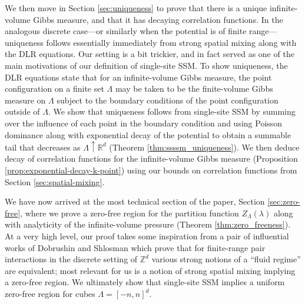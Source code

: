 \documentclass[10pt]{amsart}
\theoremstyle{definition}
\theoremstyle{remark}
\newcommand{\R}{\mathbb{R}}
\begin{document}
	We then move in Section \ref{sec:uniqueness} to prove that there is a unique infinite-volume Gibbs measure, and that it has decaying correlation functions.  
	In the analogous discrete case---or similarly when the potential is of finite range---uniqueness follows essentially immediately from strong spatial mixing along with the DLR equations.  Our setting is a bit trickier, and in fact served as one of the main motivations of our definition of single-site SSM.  To show uniqueness, the DLR equations state that for an infinite-volume Gibbs measure, the point configuration on a finite set $\Lambda$ may be taken to be the finite-volume Gibbs measure on $\Lambda$ subject to the boundary conditions of the point configuration outside of $\Lambda$.  We show that uniqueness follows from single-site SSM by summing over the influence of each point in the boundary condition and using Poisson dominance along with exponential decay of the potential to obtain a summable tail that decreases as $\Lambda \uparrow \R^d$ (Theorem \ref{thm:ssssm_uniqueness}).  We then deduce decay of correlation functions for the infinite-volume Gibbs measure (Proposition \ref{prop:exponential-decay-k-point}) using our bounds on correlation functions from Section \ref{sec:spatial-mixing}.
	
	We have now arrived at the most technical section of the paper, Section \ref{sec:zero-free}, where we prove a zero-free region for the partition function $Z_{\Lambda}(\lambda)$ along with analyticity of the infinite-volume pressure (Theorem \ref{thm:zero_freeness}).  At a very high level, our proof takes some inspiration from a pair of influential works of Dobrushin and Shlosman \cite{dobrushin1985completely,dobrushin1987completely} which prove that for finite-range pair interactions in the discrete setting of $\mathbb{Z}^d$ various strong notions of a ``fluid regime'' are equivalent; most relevant for us is a notion of strong spatial mixing implying a zero-free region.  We ultimately show that single-site SSM implies a uniform zero-free region for cubes $\Lambda = [-n,n]^d$. 
	
\end{document}
